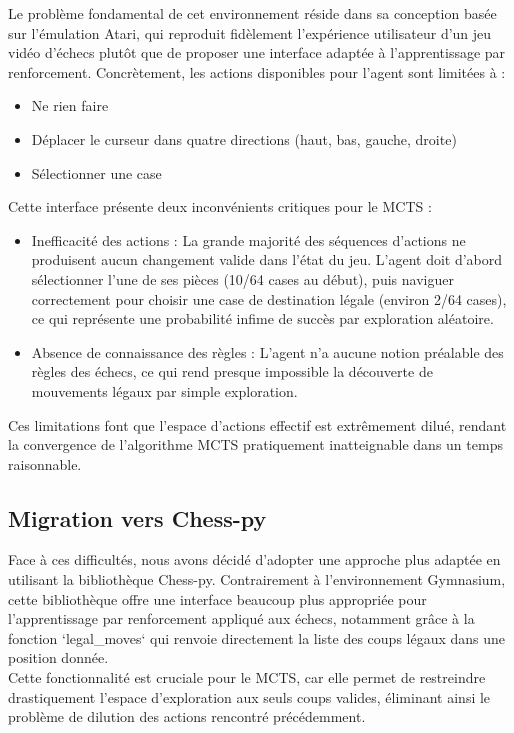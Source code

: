 \documentclass{article}
\begin{document}
Le problème fondamental de cet environnement réside dans sa conception basée sur l'émulation Atari, qui reproduit fidèlement l'expérience utilisateur d'un jeu vidéo d'échecs plutôt que de proposer une interface adaptée à l'apprentissage par renforcement. Concrètement, les actions disponibles pour l'agent sont limitées à :
\begin{itemize} 
    \item Ne rien faire
    \item Déplacer le curseur dans quatre directions (haut, bas, gauche, droite)
    \item Sélectionner une case
\end{itemize}

Cette interface présente deux inconvénients critiques pour le MCTS :
\begin{itemize} 
    \item Inefficacité des actions : La grande majorité des séquences d'actions ne produisent aucun changement valide dans l'état du jeu. L'agent doit d'abord sélectionner l'une de ses pièces (10/64 cases au début), puis naviguer correctement pour choisir une case de destination légale (environ 2/64 cases), ce qui représente une probabilité infime de succès par exploration aléatoire.
    \item Absence de connaissance des règles : L'agent n'a aucune notion préalable des règles des échecs, ce qui rend presque impossible la découverte de mouvements légaux par simple exploration.
\end{itemize}

Ces limitations font que l'espace d'actions effectif est extrêmement dilué, rendant la convergence de l'algorithme MCTS pratiquement inatteignable dans un temps raisonnable.

\subsection{Migration vers Chess-py}

\quad Face à ces difficultés, nous avons décidé d'adopter une approche plus adaptée en utilisant la bibliothèque Chess-py. Contrairement à l'environnement Gymnasium, cette bibliothèque offre une interface beaucoup plus appropriée pour l'apprentissage par renforcement appliqué aux échecs, notamment grâce à la fonction `legal\_moves` qui renvoie directement la liste des coups légaux dans une position donnée.\\

Cette fonctionnalité est cruciale pour le MCTS, car elle permet de restreindre drastiquement l'espace d'exploration aux seuls coups valides, éliminant ainsi le problème de dilution des actions rencontré précédemment.\\
\end{document}
